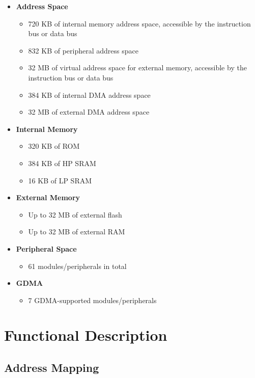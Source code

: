 \documentclass[main\_\_EN.tex]{subfiles}
\begin{document}
\begin{itemize}
    \item {\bfseries Address Space}
        \begin{itemize}
    	    \item 720 KB of internal memory address space, accessible by the instruction bus or data bus
    	    \item 832 KB of peripheral address space
    	    \item 32 MB of virtual address space for external memory, accessible by the instruction bus or data bus
    	    \item 384 KB of internal DMA address space
                \item 32 MB of external DMA address space
        \end{itemize}
    \item {\bfseries Internal Memory}
        \begin{itemize}
            \item 320 KB of ROM 
	        \item 384 KB of HP SRAM
	        \item 16 KB of LP SRAM
	    \end{itemize}
    \item {\bfseries External Memory}
        \begin{itemize}
            \item Up to 32 MB of external flash
            \item Up to 32 MB of external RAM
	    \end{itemize}
    \item \textbf{Peripheral Space}
        \begin{itemize}
           \item 61 modules/peripherals in total
        \end{itemize}
    \item {\bfseries GDMA}
        \begin{itemize}
            \item 7 GDMA-supported modules/peripherals
        \end{itemize}
\end{itemize}

\section{Functional Description}

\subsection{Address Mapping}
\end{document}
